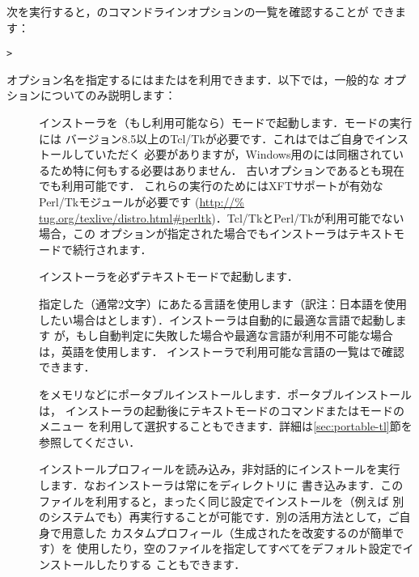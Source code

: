 \documentclass[uplatex,dvipdfmx]{jsarticle}
\begin{document}
次を実行すると，のコマンドラインオプションの一覧を確認することが
できます：
%
\begin{alltt}
> 
\end{alltt}
%
オプション名を指定するには\sopt{}または\lopt{}を利用できます．以下では，一般的な
オプションについてのみ説明します：
%
\begin{description}
\item[]
インストーラを（もし利用可能なら）\GUI モードで起動します．\GUI モードの実行には
バージョン8.5以上のTcl/Tkが必要です．これは\macOS ではご自身でインストールしていただく
必要がありますが，Windows用の\TL には同梱されているため特に何もする必要はありません．
古いオプションであるとも現在でも利用可能です．
これらの実行のためにはXFTサポートが有効なPerl/Tkモジュールが必要です (\url{http://%
tug.org/texlive/distro.html#perltk})．Tcl/TkとPerl/Tkが利用可能でない場合，この
オプションが指定された場合でもインストーラはテキストモードで続行されます．

\item[]
インストーラを必ずテキストモードで起動します．

\item[]
指定した（通常2文字）にあたる言語を使用します（訳注：日本語を使用
したい場合はとします）．インストーラは自動的に最適な言語で起動します
が，もし自動判定に失敗した場合や最適な言語が利用不可能な場合は，英語を使用します．
インストーラで利用可能な言語の一覧はで確認できます．

\item[]
\TL を\USB メモリなどにポータブルインストールします．ポータブルインストールは，
インストーラの起動後にテキストモードのコマンドまたは\GUI モードのメニュー
を利用して選択することもできます．詳細は\ref{sec:portable-tl}節を参照してください．

\item[]
インストールプロフィールを読み込み，非対話的にインストールを実行
します．なおインストーラは常にをディレクトリに
書き込みます．このファイルを利用すると，まったく同じ設定でインストールを（例えば
別のシステムでも）再実行することが可能です．別の活用方法として，ご自身で用意した
カスタムプロフィール（生成されたを改変するのが簡単です）を
使用したり，空のファイルを指定してすべてをデフォルト設定でインストールしたりする
こともできます．


\end{description}
\end{document}
